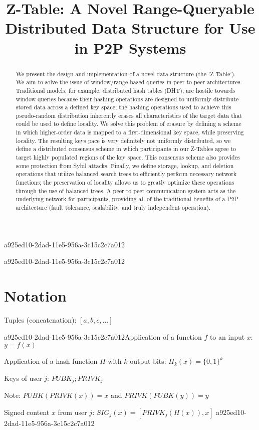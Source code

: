 \documentclass[12pt]{article}
\title{Z-Table: A Novel Range-Queryable Distributed Data Structure for Use in P2P Systems}
\begin{document}
\maketitle
a925ed10-2dad-11e5-956a-3c15c2c7a012
\begin{abstract}
We present the design and implementation of a novel data structure (the 'Z-Table'). We aim to solve the issue of window/range-based queries in peer to peer architectures. Traditional models, for example,  distributed hash tables (DHT), are hostile towards window queries because their hashing operations are designed to uniformly distribute stored data across a defined key space; the hashing operations used to achieve this pseudo-random distribution inherently erases all characteristics of the target data that could be used to define locality. We solve this problem of erasure by defining a scheme in which higher-order data is mapped to a first-dimensional key space, while preserving locality. The resulting keys pace is very definitely not uniformly distributed, so we define a distributed consensus scheme in which participants in our Z-Tables agree to target highly populated regions of the key space. This consensus scheme also provides some protection from Sybil attacks. Finally, we define storage, lookup, and deletion operations that utilize balanced search trees to efficiently perform necessary network functions; the preservation of locality allows us to greatly optimize these operations through the use of balanced trees. A peer to peer communication system acts as the underlying network for participants, providing all of the traditional benefits of a P2P architecture (fault tolerance, scalability, and truly independent operation).
\end{abstract}
a925ed10-2dad-11e5-956a-3c15c2c7a012
\section{Notation}

Tuples (concatenation): $[a,b,c,...]$

a925ed10-2dad-11e5-956a-3c15c2c7a012Application of a function $f$ to an input $x$: $y=f(x)$

Application of a hash function $H$ with $k$ output bits: $H_{k}(x) = \{0,1\}^k$

Keys of user $j$: $ PUBK_j; PRIVK_j $

Note: $PUBK(PRIVK(x)) = x$ and $PRIVK(PUBK(y)) = y$~

Signed content $x$ from user $j$: $SIG_j(x) = \left[ PRIVK_j( H(x) ), x \right]$
a925ed10-2dad-11e5-956a-3c15c2c7a012
\end{document}

